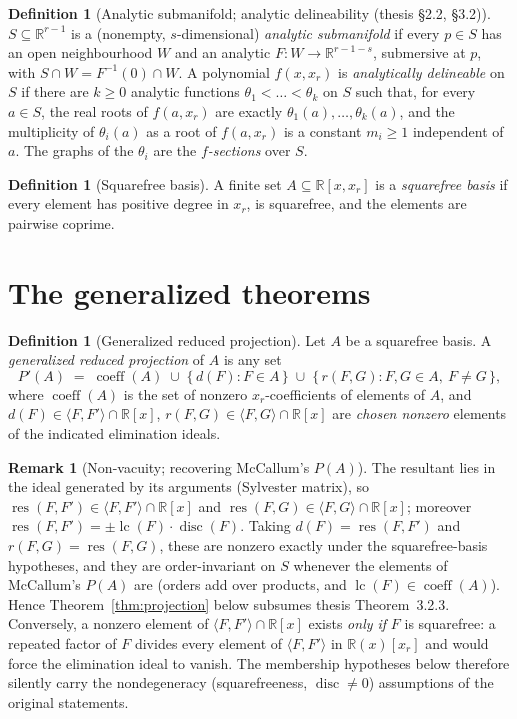 \documentclass[11pt,a4paper]{article}
\theoremstyle{plain}
\theoremstyle{definition}
\newtheorem{definition}[theorem]{Definition}
\newtheorem{remark}[theorem]{Remark}
\newcommand{\R}{\mathbb{R}}
\DeclareMathOperator{\res}{res}
\DeclareMathOperator{\disc}{disc}
\DeclareMathOperator{\coeff}{coeff}
\DeclareMathOperator{\lc}{lc}
\newcommand{\ideal}[1]{\langle #1\rangle}
\begin{document}
\begin{definition}[Analytic submanifold; analytic delineability (thesis \S2.2, \S3.2)]
$S\subseteq\R^{r-1}$ is a (nonempty, $s$-dimensional) \emph{analytic
submanifold} if every $p\in S$ has an open neighbourhood $W$ and an analytic
$F:W\to\R^{r-1-s}$, submersive at $p$, with $S\cap W=F^{-1}(0)\cap W$.
A polynomial $f(x,x_r)$ is \emph{analytically delineable} on $S$ if there are
$k\ge 0$ analytic functions $\theta_1<\dots<\theta_k$ on $S$ such that, for
every $a\in S$, the real roots of $f(a,x_r)$ are exactly
$\theta_1(a),\dots,\theta_k(a)$, and the multiplicity of $\theta_i(a)$ as a
root of $f(a,x_r)$ is a constant $m_i\ge 1$ independent of $a$. The graphs of
the $\theta_i$ are the \emph{$f$-sections} over $S$.
\end{definition}

\begin{definition}[Squarefree basis]
A finite set $A\subseteq\R[x,x_r]$ is a \emph{squarefree basis} if every
element has positive degree in $x_r$, is squarefree, and the elements are
pairwise coprime.
\end{definition}

\section{The generalized theorems}\label{sec:statements}

\begin{definition}[Generalized reduced projection]\label{def:proj}
Let $A$ be a squarefree basis. A \emph{generalized reduced projection} of $A$
is any set
\[
  P'(A) \;=\; \coeff(A)\;\cup\;\{\,d(F) : F\in A\,\}\;\cup\;
              \{\,r(F,G) : F,G\in A,\ F\neq G\,\},
\]
where $\coeff(A)$ is the set of nonzero $x_r$-coefficients of elements of $A$,
and $d(F)\in\ideal{F,F'}\cap\R[x]$, $r(F,G)\in\ideal{F,G}\cap\R[x]$ are
\emph{chosen nonzero} elements of the indicated elimination ideals.
\end{definition}

\begin{remark}[Non-vacuity; recovering McCallum's $P(A)$]\label{rem:recover}
The resultant lies in the ideal generated by its arguments (Sylvester matrix),
so $\res(F,F')\in\ideal{F,F'}\cap\R[x]$ and $\res(F,G)\in\ideal{F,G}\cap\R[x]$;
moreover $\res(F,F')=\pm\lc(F)\cdot\disc(F)$. Taking
$d(F)=\res(F,F')$ and $r(F,G)=\res(F,G)$, these are nonzero exactly under the
squarefree-basis hypotheses, and they are order-invariant on $S$ whenever the
elements of McCallum's $P(A)$ are (orders add over products, and
$\lc(F)\in\coeff(A)$). Hence Theorem~\ref{thm:projection} below subsumes thesis
Theorem~3.2.3. Conversely, a nonzero element of $\ideal{F,F'}\cap\R[x]$ exists
\emph{only if} $F$ is squarefree: a repeated factor of $F$ divides every
element of $\ideal{F,F'}$ in $\R(x)[x_r]$ and would force the elimination ideal
to vanish. The membership hypotheses below therefore silently carry the
nondegeneracy (squarefreeness, $\disc\neq 0$) assumptions of the original
statements.
\end{remark}
\end{document}
